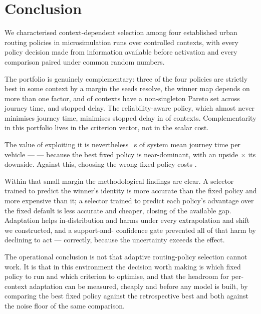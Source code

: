 \section{Conclusion}

We characterised context-dependent selection among four established urban
routing policies in \NumRuns{} microsimulation runs over \NumContexts{}
controlled contexts, with every policy decision made from information available
before activation and every comparison paired under common random numbers.

The portfolio is genuinely complementary: three of the four policies are
strictly best in some context by a margin the seeds resolve, the winner map
depends on more than one factor, and \NumParetoNonSingleton{} of contexts have a
non-singleton Pareto set across journey time, \CO{} and stopped delay. The
reliability-aware policy, which almost never minimises journey time, minimises
stopped delay in \NumSpecCThreePct{} of contexts. Complementarity in this
portfolio lives in the criterion vector, not in the scalar cost.

The value of exploiting it is nevertheless \NumHeadroom~s of system mean journey
time per vehicle --- \NumHeadroomPct{} --- because the best fixed policy is
near-dominant, with an upside \NumAsymRatio$\times$ its downside. Against this,
choosing the wrong fixed policy costs \NumFixedWorstPenaltyPct{}.

Within that small margin the methodological findings are clear. A selector
trained to predict the winner's identity is more accurate than the fixed policy
and more expensive than it; a selector trained to predict each policy's
advantage over the fixed default is less accurate and cheaper, closing
\NumBFourGapClosed{} of the available gap. Adaptation helps in-distribution and
harms under every extrapolation and shift we constructed, and a support-and-
confidence gate prevented all of that harm by declining to act --- correctly,
because the uncertainty exceeds the effect.

The operational conclusion is not that adaptive routing-policy selection cannot
work. It is that in this environment the decision worth making is which fixed
policy to run and which criterion to optimise, and that the headroom for
per-context adaptation can be measured, cheaply and before any model is built,
by comparing the best fixed policy against the retrospective best and both
against the noise floor of the same comparison.
